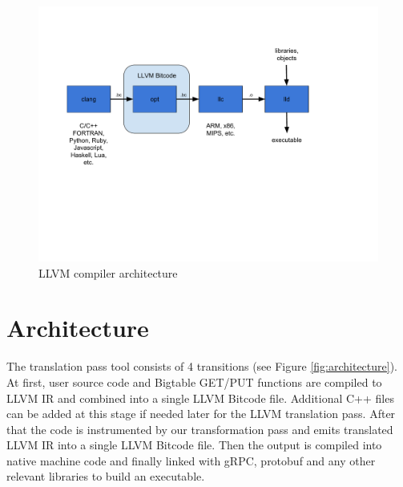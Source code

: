 \documentclass[bsc,frontabs,twoside,singlespacing,parskip,deptreport]{infthesis}     %
\begin{document}
\begin{figure}[H]
\centering
\includegraphics[width=1\textwidth]{images/llvm}
\caption{LLVM compiler architecture}
\label{fig:llvm}
\end{figure}

\section{Architecture}


The translation pass tool consists of 4 transitions (see Figure \ref{fig:architecture}). At first, user source code and Bigtable GET/PUT functions are compiled to LLVM IR and combined into a single LLVM Bitcode file. Additional C++ files can be added at this stage if needed later for the LLVM translation pass. After that the code is instrumented by our transformation pass and emits translated LLVM IR into a single LLVM Bitcode file. Then the output is compiled into native machine code and finally linked with gRPC, protobuf and any other relevant libraries to build an executable.
\end{document}
